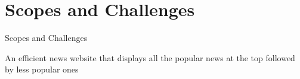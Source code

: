 \section{Scopes and Challenges}

\begin{frame}{Scopes and Challenges}
    \begin{center}\fontsize{15}{1}\selectfont
           An efficient news website that displays all the popular news at the top followed by less popular ones
        \end{center}
\end{frame}